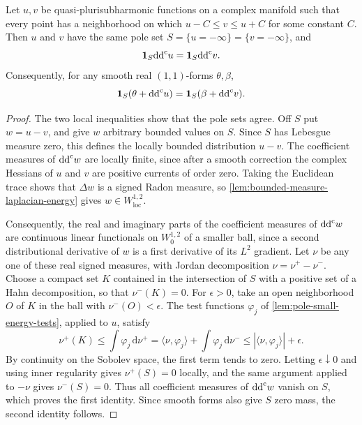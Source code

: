 \begin{proposition}\label{prop:bounded-type-polar-invariance}
Let $u,v$ be quasi-plurisubharmonic functions on a complex manifold such that every point has a neighborhood on which $u-C\leq v\leq u+C$ for some constant $C$. Then $u$ and $v$ have the same pole set $S=\{u=-\infty\}=\{v=-\infty\}$, and
\[
 \mathbf1_S\mathrm{dd}^{\mathrm{c}} u=\mathbf1_S\mathrm{dd}^{\mathrm{c}} v.
\]
Consequently, for any smooth real $(1,1)$-forms $\theta,\beta$,
\[
 \mathbf1_S(\theta+\mathrm{dd}^{\mathrm{c}} u)=\mathbf1_S(\beta+\mathrm{dd}^{\mathrm{c}} v).
\]
\end{proposition}
\begin{proof}
The two local inequalities show that the pole sets agree. Off $S$ put $w=u-v$, and give $w$ arbitrary bounded values on $S$. Since $S$ has Lebesgue measure zero, this defines the locally bounded distribution $u-v$. The coefficient measures of $\mathrm{dd}^{\mathrm{c}} w$ are locally finite, since after a smooth correction the complex Hessians of $u$ and $v$ are positive currents of order zero. Taking the Euclidean trace shows that $\Delta w$ is a signed Radon measure, so \cref{lem:bounded-measure-laplacian-energy} gives $w\in W^{1,2}_{\mathrm{loc}}$.

Consequently, the real and imaginary parts of the coefficient measures of $\mathrm{dd}^{\mathrm{c}} w$ are continuous linear functionals on $W^{1,2}_0$ of a smaller ball, since a second distributional derivative of $w$ is a first derivative of its $L^2$ gradient. Let $\nu$ be any one of these real signed measures, with Jordan decomposition $\nu=\nu^+-\nu^-$. Choose a compact set $K$ contained in the intersection of $S$ with a positive set of a Hahn decomposition, so that $\nu^-(K)=0$. For $\epsilon>0$, take an open neighborhood $O$ of $K$ in the ball with $\nu^-(O)<\epsilon$. The test functions $\varphi_j$ of \cref{lem:pole-small-energy-tests}, applied to $u$, satisfy
\[
 \nu^+(K)\leq\int\varphi_j\,\mathrm d\nu^+
       =\langle\nu,\varphi_j\rangle
          +\int\varphi_j\,\mathrm d\nu^-
       \leq|\langle\nu,\varphi_j\rangle|+\epsilon.
\]
By continuity on the Sobolev space, the first term tends to zero. Letting $\epsilon\downarrow0$ and using inner regularity gives $\nu^+(S)=0$ locally, and the same argument applied to $-\nu$ gives $\nu^-(S)=0$. Thus all coefficient measures of $\mathrm{dd}^{\mathrm{c}} w$ vanish on $S$, which proves the first identity. Since smooth forms also give $S$ zero mass, the second identity follows.
\end{proof}

